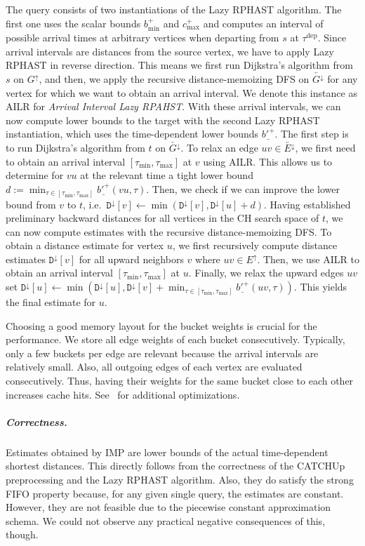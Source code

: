 \documentclass[a4paper,UKenglish,cleveref, autoref, thm-restate]{lipics-v2021}
\newcommand*{\comb}{c}
\newcommand*{\tdep}{\tau^{\operatorname{dep}}}
\newcommand*{\gchu}{G^{\uparrow}}
\newcommand*{\gchd}{\overleftarrow{G^{\downarrow}}}
\newcommand*{\echu}{E^{\uparrow}}
\newcommand*{\rechd}{\overleftarrow{E^{\downarrow}}}
\newcommand*{\pcfn}{\underline{b'^+}}
\begin{document}
The query consists of two instantiations of the Lazy RPHAST algorithm.
The first one uses the scalar bounds $b^+_{\min}$ and $\comb^+_{\max}$ and computes an interval of possible arrival times at arbitrary vertices when departing from $s$ at $\tdep$.
Since arrival intervals are distances from the source vertex, we have to apply Lazy RPHAST in reverse direction.
This means we first run Dijkstra's algorithm from $s$ on $\gchu$, and then, we apply the recursive distance-memoizing DFS on $\gchd$ for any vertex for which we want to obtain an arrival interval.
We denote this instance as AILR for \emph{Arrival Interval Lazy RPAHST}.
With these arrival intervals, we can now compute lower bounds to the target with the second Lazy RPHAST instantiation, which uses the time-dependent lower bounds $\pcfn$.
The first step is to run Dijkstra's algorithm from $t$ on $\gchd$.
To relax an edge $uv \in \rechd$, we first need to obtain an arrival interval $[\tau_{\min}, \tau_{\max}]$ at $v$ using AILR.
This allows us to determine for $vu$ at the relevant time a tight lower bound $d := \min_{\tau \in [\tau_{\min}, \tau_{\max}]} \pcfn(vu, \tau)$.
Then, we check if we can improve the lower bound from $v$ to $t$, i.e.\ $\mathtt{D}^{\downarrow}[v] \leftarrow \min(\mathtt{D}^{\downarrow}[v], \mathtt{D}^{\downarrow}[u] + d)$.
Having established preliminary backward distances for all vertices in the CH search space of $t$, we can now compute estimates with the recursive distance-memoizing DFS.
To obtain a distance estimate for vertex $u$, we first recursively compute distance estimates $\mathtt{D}^{\downarrow}[v]$ for all upward neighbors $v$ where $uv \in \echu$.
Then, we use AILR to obtain an arrival interval $[\tau_{\min}, \tau_{\max}]$ at $u$.
Finally, we relax the upward edges $uv$ set $\mathtt{D}^{\downarrow}[u] \leftarrow \min(\mathtt{D}^{\downarrow}[u], \mathtt{D}^{\downarrow}[v] + \min_{\tau \in [\tau_{\min}, \tau_{\max}]} \pcfn(uv, \tau))$.
This yields the final estimate for $u$.

Choosing a good memory layout for the bucket weights is crucial for the performance.
We store all edge weights of each bucket consecutively.
Typically, only a few buckets per edge are relevant because the arrival intervals are relatively small.
Also, all outgoing edges of each vertex are evaluated consecutively.
Thus, having their weights for the same bucket close to each other increases cache hits.
See~\cite{wz-cplttdap-22} for additional optimizations.

\subparagraph{Correctness.}
Estimates obtained by IMP are lower bounds of the actual time-dependent shortest distances.
This directly follows from the correctness of the CATCHUp preprocessing and the Lazy RPHAST algorithm.
Also, they do satisfy the strong FIFO property because, for any given single query, the estimates are constant.
However, they are not feasible due to the piecewise constant approximation schema.
We could not observe any practical negative consequences of this, though.
\end{document}
